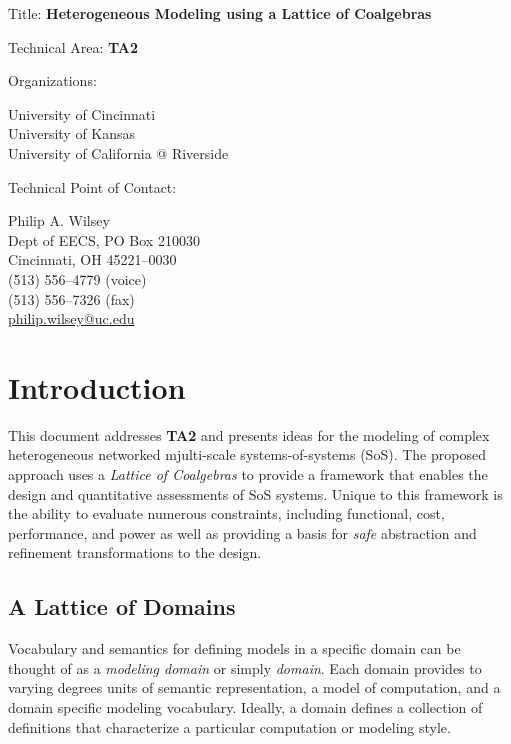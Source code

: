 \documentclass[12pt]{article}
\begin{document}
\noindent
{\Large Title: \textbf{Heterogeneous Modeling using a Lattice of Coalgebras}}

\bigskip
\bigskip
\bigskip
\bigskip
\bigskip

\noindent
Technical Area: \textbf{TA2}

\bigskip
\bigskip
\bigskip
\bigskip

\noindent
Organizations: \begin{minipage}[t]{4in}
  \textsf{University of Cincinnati} \\
  \textsf{University of Kansas} \\
  \textsf{University of California @ Riverside}
\end{minipage}

\bigskip
\bigskip
\bigskip
\bigskip

\noindent
Technical Point of Contact: \begin{minipage}[t]{4in}
  Philip A. Wilsey \\
  Dept of EECS, PO Box 210030 \\
  Cincinnati, OH 45221--0030 \\
  (513) 556--4779 (voice) \\
  (513) 556--7326 (fax) \\
  \url{philip.wilsey@uc.edu}
\end{minipage}

\clearpage

\section{Introduction}

This document addresses \textbf{TA2} and presents ideas for the
modeling of complex heterogeneous networked mjulti-scale
systems-of-systems (SoS).  The proposed approach uses a \emph{Lattice
  of Coalgebras} to provide a framework that enables the design and
quantitative assessments of SoS systems.  Unique to this framework is
the ability to evaluate numerous constraints, including functional,
cost, performance, and power as well as providing a basis for
\emph{safe} abstraction and refinement transformations to the design.

\subsection{A Lattice of Domains}

Vocabulary and semantics for defining models in a specific domain can
be thought of as a \emph{modeling domain} or simply \emph{domain}.
Each domain provides to varying degrees units of semantic
representation, a model of computation, and a domain specific modeling
vocabulary.  Ideally, a domain defines a collection of definitions
that characterize a particular computation or modeling style.
\end{document}
